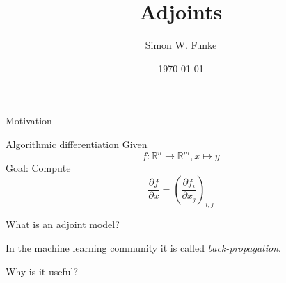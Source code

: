 \documentclass[mathserif]{beamer}
\title[Scientific Computing Seminar]{Adjoints}
\author{Simon W. Funke}
\institute{Simula Research Laboratory}
\date{\today}
\begin{document}
\simulatitlepage


\begin{frame}{Motivation}

\end{frame}


\begin{frame}{Algorithmic differentiation}
Given
\begin{equation}
f: \mathbb R^n \to \mathbb R^m, x \mapsto y
\end{equation}
Goal: Compute
\begin{equation}
\frac{\partial f}{\partial x} = \left(\frac{\partial f_i}{\partial x_j}\right)_{i, j}
\end{equation}
\end{frame}

\begin{frame}{What is an adjoint model?}
  

In the machine learning community it is called \emph{back-propagation}.

\end{frame}



\begin{frame}{Why is it useful?}
  

\end{frame}



\end{document}
